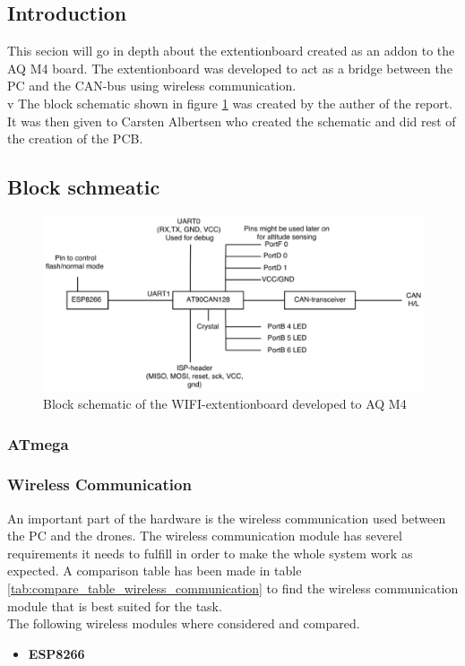 \subsection{Introduction}
This secion will go in depth about the extentionboard created as an addon to the AQ M4 board. The extentionboard was developed to act as a bridge between the PC and the CAN-bus using wireless communication.\\
v
The block schematic shown in figure \ref{fig:PCB_block} was created by the auther of the report. It was then given to Carsten Albertsen who created the schematic and did rest of the creation of the PCB.
\\
\subsection{Block schmeatic}
\begin{figure}[H]
    \center
    \includegraphics[width=1\textwidth]{graphics/PCB_block_v3.eps}
    \caption{Block schematic of the WIFI-extentionboard developed to AQ M4}
    \label{fig:PCB_block}
\end{figure}

\subsubsection{ATmega}
\subsubsection{Wireless Communication}
An important part of the hardware is the wireless communication used between the PC and the drones.
The wireless communication module has severel requirements it needs to fulfill in order to make the whole system work as expected. A comparison table has been made in table \ref{tab:compare_table_wireless_communication} to find the wireless communication module that is best suited for the task. \\
The following wireless modules where considered and compared.
\begin{itemize}
	\item \textbf{ESP8266}
\end{itemize}

